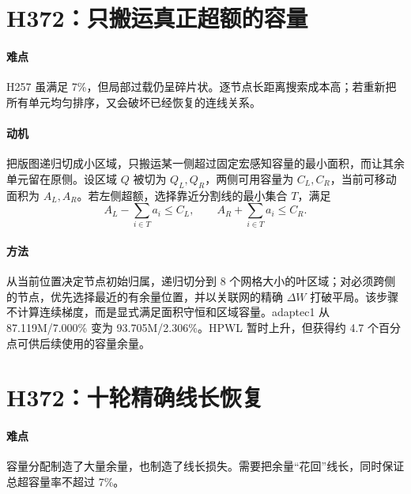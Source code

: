 \documentclass[UTF8,a4paper,11pt]{ctexrep}
\begin{document}
\section{H372：只搬运真正超额的容量}
\paragraph{难点}
H257 虽满足 7\%，但局部过载仍呈碎片状。逐节点长距离搜索成本高；若重新把所有单元均匀排序，又会破坏已经恢复的连线关系。

\paragraph{动机}
把版图递归切成小区域，只搬运某一侧超过固定宏感知容量的最小面积，而让其余单元留在原侧。设区域 $Q$ 被切为 $Q_L,Q_R$，两侧可用容量为 $C_L,C_R$，当前可移动面积为 $A_L,A_R$。若左侧超额，选择靠近分割线的最小集合 $T$，满足
\begin{equation}
 A_L-\sum_{i\in T}a_i\le C_L,
 \qquad A_R+\sum_{i\in T}a_i\le C_R. \label{eq:surplus}
\end{equation}

\paragraph{方法}
从当前位置决定节点初始归属，递归切分到 8 个网格大小的叶区域；对必须跨侧的节点，优先选择最近的有余量位置，并以关联网的精确 $\Delta W$ 打破平局。该步骤不计算连续梯度，而是显式满足面积守恒和区域容量。adaptec1 从 87.119M/7.000\% 变为 93.705M/2.306\%。HPWL 暂时上升，但获得约 4.7 个百分点可供后续使用的容量余量。

\section{H372：十轮精确线长恢复}
\paragraph{难点}
容量分配制造了大量余量，也制造了线长损失。需要把余量“花回”线长，同时保证总超容量率不超过 7\%。
\end{document}
